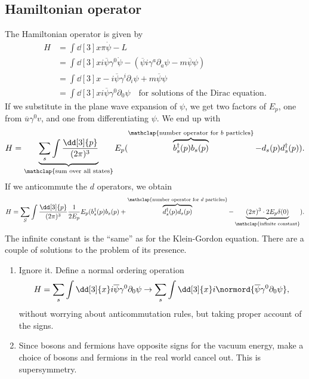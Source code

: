 \documentclass{jknotes} %
\begin{document}
\subsection{Hamiltonian operator}

The Hamiltonian operator is given by
\begin{align}
    H &= \int \dd[3]{x} \pi\dot{\psi} - L \\
      &= \int \dd[3]{x} i\overline{\psi}\gamma^0\dot{\psi} - (\overline{\psi}i\gamma^a\partial_a\psi-m\overline{\psi}\psi) \\
      &= \int \dd[3]{x} -i\overline{\psi}\gamma^i\partial_i\psi + m\overline{\psi}\psi \\
      &= \int \dd[3]{x} i\overline{\psi}\gamma^0\partial_0\psi \quad \text{for solutions of the Dirac equation.}
\end{align}
If we substitute in the plane wave expansion of \(\psi\), we get two factors of \(E_p\), one from \(\overline{u}\gamma^0 v\), and one from differentiating \(\psi\). We end up with
\begin{equation}
    H = \underbrace{\sum_s\int\frac{\dd[3]{p}}{(2\pi)^3}}_{\mathclap{\text{sum over all states}}} E_p 
    ( \overbrace{b_s^\dagger(p)b_s(p)}^{\mathclap{\text{number operator for \(b\) particles}}} - d_s(p)d_s^\dagger(p)).
\end{equation}
If we anticommute the \(d\) operators, we obtain
\begin{equation}
    H = \sum_S\int\frac{\dd[3]{p}}{(2\pi)^3}\frac{1}{2E_p}E_p(b_s^\dagger(p)b_s(p) + \overbrace{d_s^\dagger(p)d_s(p)}^{\mathclap{\text{number operator for \(d\) particles}}} - \underbrace{(2\pi)^3\cdot 2E_p\delta(0)}_{\mathclap{\text{infinite constant}}}).
\end{equation}
The infinite constant is the ``same'' as for the Klein-Gordon equation. There are a couple of solutions to the problem of its presence.
\begin{enumerate}
    \item Ignore it. Define a normal ordering operation
        \begin{equation}
            H = \sum_s\int\dd[3]{x}i\overline{\psi}\gamma^0\partial_0\psi\to\sum_s\int\dd[3]{x} i \normord{\overline{\psi}\gamma^0\partial_0\psi},
        \end{equation}
        without worrying about anticommutation rules, but taking proper account of the signs.
    \item Since bosons and fermions have opposite signs for the vacuum energy, make a choice of bosons and fermions in the real world cancel out. This is supersymmetry.
\end{enumerate}
\end{document}
